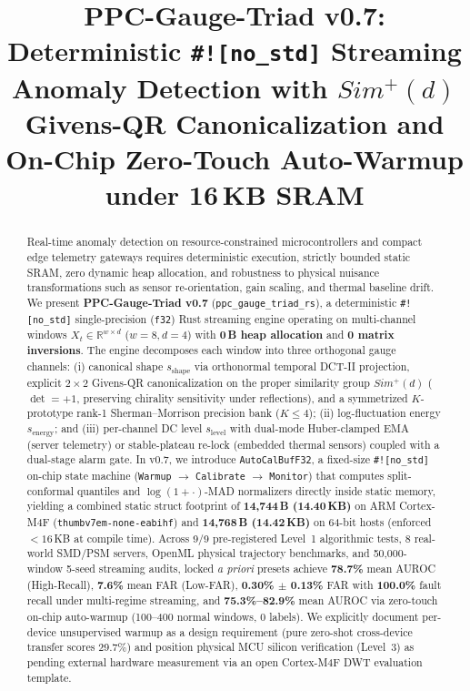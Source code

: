 \documentclass[conference]{IEEEtran}
\title{PPC-Gauge-Triad v0.7: Deterministic \texttt{\#![no\_std]} Streaming Anomaly Detection with $Sim^+(d)$ Givens-QR Canonicalization and On-Chip Zero-Touch Auto-Warmup under 16\,KB SRAM}
\author{
  \IEEEauthorblockN{Imlevion}
  \IEEEauthorblockA{PPC-Gauge-Triad Project\\
  Repository: \url{https://github.com/Imlevion/ppc-gauge-triad}}
}
\begin{document}
\maketitle

\begin{abstract}
Real-time anomaly detection on resource-constrained microcontrollers and compact edge telemetry gateways requires deterministic execution, strictly bounded static SRAM, zero dynamic heap allocation, and robustness to physical nuisance transformations such as sensor re-orientation, gain scaling, and thermal baseline drift. We present \textbf{PPC-Gauge-Triad v0.7} (\texttt{ppc\_gauge\_triad\_rs}), a deterministic \texttt{\#![no\_std]} single-precision (\texttt{f32}) Rust streaming engine operating on multi-channel windows $X_t \in \mathbb{R}^{w \times d}$ ($w=8, d=4$) with \textbf{0\,B heap allocation} and \textbf{0 matrix inversions}. The engine decomposes each window into three orthogonal gauge channels: (i) canonical shape $s_{\text{shape}}$ via orthonormal temporal DCT-II projection, explicit $2\times 2$ Givens-QR canonicalization on the proper similarity group $Sim^+(d)$ ($\det=+1$, preserving chirality sensitivity under reflections), and a symmetrized $K$-prototype rank-1 Sherman--Morrison precision bank ($K \le 4$); (ii) log-fluctuation energy $s_{\text{energy}}$; and (iii) per-channel DC level $s_{\text{level}}$ with dual-mode Huber-clamped EMA (server telemetry) or stable-plateau re-lock (embedded thermal sensors) coupled with a dual-stage alarm gate. In v0.7, we introduce \texttt{AutoCalBufF32}, a fixed-size \texttt{\#![no\_std]} on-chip state machine (\texttt{Warmup} $\to$ \texttt{Calibrate} $\to$ \texttt{Monitor}) that computes split-conformal quantiles and $\log(1+\cdot)$-MAD normalizers directly inside static memory, yielding a combined static struct footprint of \textbf{14,744\,B (14.40\,KB)} on ARM Cortex-M4F (\texttt{thumbv7em-none-eabihf}) and \textbf{14,768\,B (14.42\,KB)} on 64-bit hosts (enforced $<16$\,KB at compile time). Across 9/9 pre-registered Level~1 algorithmic tests, 8 real-world SMD/PSM servers, OpenML physical trajectory benchmarks, and 50,000-window 5-seed streaming audits, locked \emph{a priori} presets achieve \textbf{78.7\%} mean AUROC (High-Recall), \textbf{7.6\%} mean FAR (Low-FAR), \textbf{0.30\% $\pm$ 0.13\%} FAR with \textbf{100.0\%} fault recall under multi-regime streaming, and \textbf{75.3\%--82.9\%} mean AUROC via zero-touch on-chip auto-warmup (100--400 normal windows, 0 labels). We explicitly document per-device unsupervised warmup as a design requirement (pure zero-shot cross-device transfer scores 29.7\%) and position physical MCU silicon verification (Level~3) as pending external hardware measurement via an open Cortex-M4F DWT evaluation template.
\end{abstract}
\end{document}
